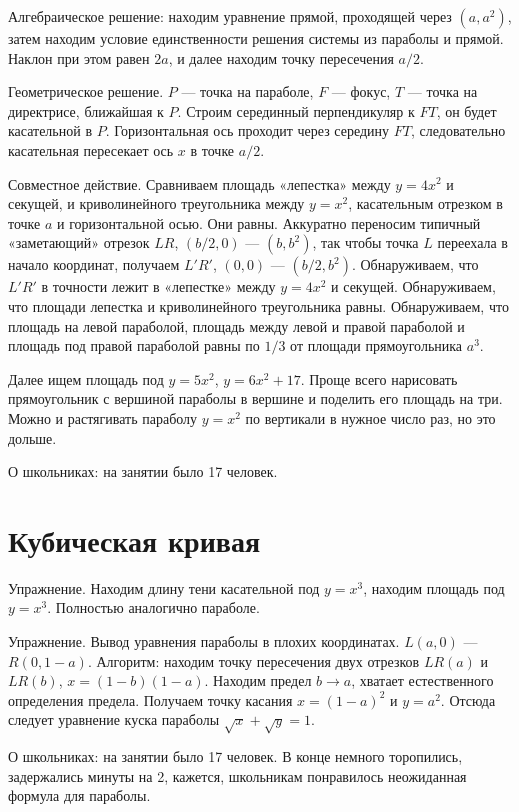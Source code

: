 \documentclass[12pt]{article}
\theoremstyle{definition}
\begin{document}
Алгебраическое решение: находим уравнение прямой, проходящей через $(a, a^2)$, затем 
находим условие единственности решения системы из параболы и прямой. Наклон при этом равен $2a$, 
и далее находим точку пересечения $a/2$.

Геометрическое решение. $P$ — точка на параболе, $F$ — фокус, $T$ — точка на директрисе,
ближайшая к $P$. Строим серединный перпендикуляр к $FT$, он будет касательной в $P$. 
Горизонтальная ось проходит через середину $FT$, следовательно касательная пересекает ось $x$ 
в точке $a/2$. 


Совместное действие. Сравниваем площадь «лепестка» между $y=4x^2$ и секущей, и криволинейного треугольника
между $y=x^2$, касательным отрезком в точке $a$ и горизонтальной осью. Они равны. 
Аккуратно переносим типичный «заметающий» отрезок $LR$, $(b/2, 0)$ — $(b, b^2)$, так чтобы 
точка $L$ переехала в начало координат, получаем $L'R'$, $(0, 0)$ — $(b/2, b^2)$. 
Обнаруживаем, что $L'R'$ в точности лежит в «лепестке» между $y=4x^2$ и секущей.
Обнаруживаем, что площади лепестка и криволинейного треугольника равны. Обнаруживаем, что площадь
на левой параболой, площадь между левой и правой параболой и площадь под правой параболой равны по $1/3$ от площади прямоугольника $a^3$.

Далее ищем площадь под $y=5x^2$, $y=6x^2 + 17$.
Проще всего нарисовать прямоугольник с вершиной параболы в вершине и поделить его площадь на три. 
Можно и растягивать параболу $y=x^2$ по вертикали в нужное число раз, но это дольше. 

О школьниках: на занятии было 17 человек.

\section{Кубическая кривая}

Упражнение. Находим длину тени касательной под $y=x^3$, находим площадь под $y=x^3$.
Полностью аналогично параболе. 

Упражнение. Вывод уравнения параболы в плохих координатах. $L(a, 0)$ — $R(0, 1-a)$.
Алгоритм: находим точку пересечения двух отрезков $LR(a)$ и $LR(b)$, $x=(1-b)(1-a)$.
Находим предел $b\to a$, хватает естественного определения предела. Получаем точку касания
$x=(1-a)^2$ и $y=a^2$. Отсюда следует уравнение куска параболы $\sqrt x + \sqrt y = 1$.

О школьниках: на занятии было 17 человек. В конце немного торопились, задержались минуты на 2,
кажется, школьникам понравилось неожиданная формула для параболы. 
\end{document}

